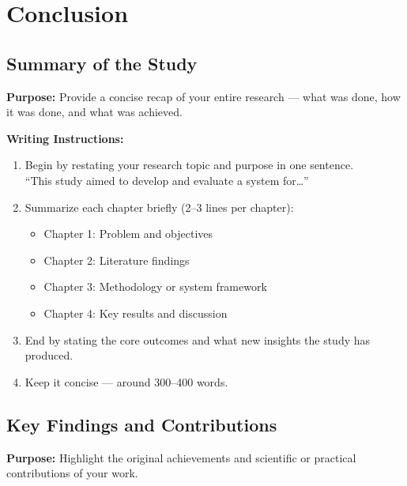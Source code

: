 \chapter{Conclusion}
\label{Conclusion}



\section{Summary of the Study}

{\color{blue}\textbf{Purpose:}
Provide a concise recap of your entire research — what was done, how it was done, and what was achieved.} \\

{\color{red}\textbf{Writing Instructions:}
\begin{enumerate}
    \item Begin by restating your research topic and purpose in one sentence.\\
    ``This study aimed to develop and evaluate a system for…''
    
    \item Summarize each chapter briefly (2–3 lines per chapter):
    \begin{itemize}
        \item Chapter 1: Problem and objectives
        \item Chapter 2: Literature findings
        \item Chapter 3: Methodology or system framework
        \item Chapter 4: Key results and discussion
    \end{itemize}
    
    \item End by stating the core outcomes and what new insights the study has produced.
    
    \item Keep it concise — around 300–400 words.
\end{enumerate}}


\section{Key Findings and Contributions}

{\color{blue}\textbf{Purpose:}
Highlight the original achievements and scientific or practical contributions of your work.} \\

